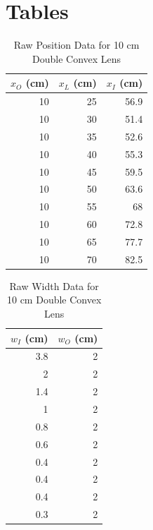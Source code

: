 \section{Tables}
%
\begin{table}[ht]
    \centering
    \begin{tabular}{|r|r|r|}
        \hline
        $x_{O}$ (cm) & $x_{L}$ (cm) & $x_{I}$ (cm) \\
        \hline
        10 & 25 & 56.9 \\
        10 & 30 & 51.4 \\
        10 & 35 & 52.6 \\
        10 & 40 & 55.3 \\
        10 & 45 & 59.5 \\
        10 & 50 & 63.6 \\
        10 & 55 & 68 \\
        10 & 60 & 72.8 \\
        10 & 65 & 77.7 \\
        10 & 70 & 82.5 \\
        \hline
        \end{tabular}
    \caption{Raw Position Data for 10 cm Double Convex Lens}
    \label{table.08.position.10cm}
\end{table}
%
\begin{table}[ht]
    \centering
    \begin{tabular}{|r|r|}
        \hline
        $w_{I}$ (cm) & $w_{O}$ (cm) \\
        \hline
        3.8 & 2 \\
        2 & 2 \\
        1.4 & 2 \\
        1 & 2 \\
        0.8 & 2 \\
        0.6 & 2 \\
        0.4 & 2 \\
        0.4 & 2 \\
        0.4 & 2 \\
        0.3 & 2 \\
        \hline
    \end{tabular}
    \caption{Raw Width Data for 10 cm Double Convex Lens}
    \label{table.08.width.10cm}
\end{table}
%
